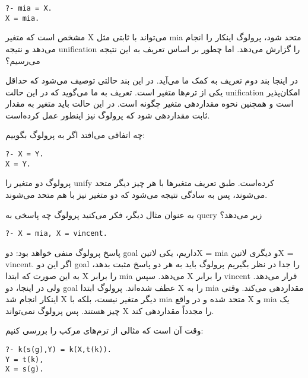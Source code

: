 \begin{latin}
\begin{lstlisting}
?- mia = X.
X = mia.

\end{lstlisting}
\end{latin}

مشخص است که متغیر X می‌تواند با ثابتی مثل mia متحد شود، پرولوگ اینکار را انجام می‌دهد و نتیجه unification را گزارش می‌دهد. اما چطور بر اساس تعریف به این نتیجه می‌رسیم؟

در اینجا بند دوم تعریف به کمک ما می‌آید. در این بند حالتی توصیف می‌شود که حداقل یکی از ترم‌ها متغیر است. تعریف به ما می‌گوید که در این حالت unification امکان‌پذیر است و همچنین نحوه مقداردهی متغیر چگونه است. در این حالت باید متغیر به مقدار ثابت مقداردهی شود که پرولوگ نیز اینطور عمل کرده‌است. 

چه اتفاقی می‌افتد اگر به پرولوگ بگوییم:

\begin{latin}
\begin{lstlisting}
?- X = Y.
X = Y.
\end{lstlisting}
\end{latin}

پرولوگ دو متغیر را unify کرده‌است. طبق تعریف متغیرها با هر چیز دیگر متحد می‌شوند، پس به سادگی نتیجه می‌شود که دو متغیر نیز با هم متحد می‌شوند.

به عنوان مثال دیگر، فکر می‌کنید پرولوگ چه پاسخی به query زیر می‌دهد؟
\begin{latin}
\begin{lstlisting}
?- X = mia, X = vincent.
\end{lstlisting}
\end{latin}

پاسخ پرولوگ منفی خواهد بود: دو goal داریم، یکی ‌لاتین{X = mia} و دیگری ‌لاتین{X = vincent}. اگر این دو goal‌ را جدا در نظر بگیریم پرولوگ باید به هر دو پاسخ مثبت بدهد، به این صورت که ابتدا X را برابر mia می‌دهد. سپس X را برابر vincent قرار می‌دهد. ولی در اینجا، دو goal عطف شده‌اند. پرولوگ ابتدا X را به mia مقداردهی می‌کند. وقتی اینکار انجام شد X دیگر متغیر نیست، بلکه با mia متحد شده و در واقع X و mia یک چیز هستند. پس پرولوگ نمی‌تواند X را مجدداً مقداردهی کند.

وقت آن است که مثالی از ترم‌های مرکب را بررسی کنیم:
\begin{latin}
\begin{lstlisting}
?- k(s(g),Y) = k(X,t(k)). 
Y = t(k),
X = s(g).
\end{lstlisting}
\end{latin}

